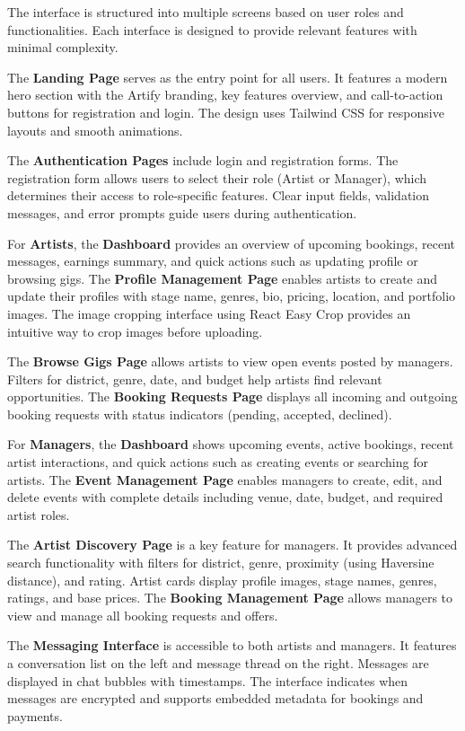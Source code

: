 \documentclass[12pt,a4paper]{report}
\begin{document}
The interface is structured into multiple screens based on user roles and functionalities. Each interface is designed to provide relevant features with minimal complexity.

The \textbf{Landing Page} serves as the entry point for all users. It features a modern hero section with the Artify branding, key features overview, and call-to-action buttons for registration and login. The design uses Tailwind CSS for responsive layouts and smooth animations.

The \textbf{Authentication Pages} include login and registration forms. The registration form allows users to select their role (Artist or Manager), which determines their access to role-specific features. Clear input fields, validation messages, and error prompts guide users during authentication.

For \textbf{Artists}, the \textbf{Dashboard} provides an overview of upcoming bookings, recent messages, earnings summary, and quick actions such as updating profile or browsing gigs. The \textbf{Profile Management Page} enables artists to create and update their profiles with stage name, genres, bio, pricing, location, and portfolio images. The image cropping interface using React Easy Crop provides an intuitive way to crop images before uploading.

The \textbf{Browse Gigs Page} allows artists to view open events posted by managers. Filters for district, genre, date, and budget help artists find relevant opportunities. The \textbf{Booking Requests Page} displays all incoming and outgoing booking requests with status indicators (pending, accepted, declined).

For \textbf{Managers}, the \textbf{Dashboard} shows upcoming events, active bookings, recent artist interactions, and quick actions such as creating events or searching for artists. The \textbf{Event Management Page} enables managers to create, edit, and delete events with complete details including venue, date, budget, and required artist roles.

The \textbf{Artist Discovery Page} is a key feature for managers. It provides advanced search functionality with filters for district, genre, proximity (using Haversine distance), and rating. Artist cards display profile images, stage names, genres, ratings, and base prices. The \textbf{Booking Management Page} allows managers to view and manage all booking requests and offers.

The \textbf{Messaging Interface} is accessible to both artists and managers. It features a conversation list on the left and message thread on the right. Messages are displayed in chat bubbles with timestamps. The interface indicates when messages are encrypted and supports embedded metadata for bookings and payments.
\end{document}
